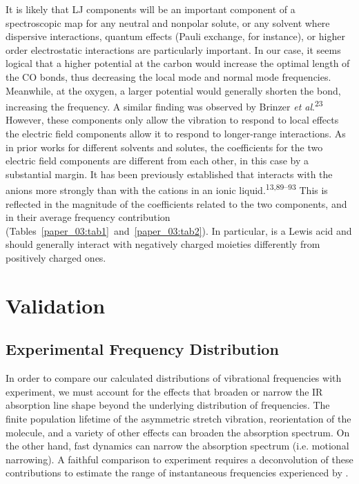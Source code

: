 \documentclass[]{article}
\begin{document}
It is likely that LJ components will be an important component of a spectroscopic map for any neutral and nonpolar solute, or any solvent where dispersive interactions, quantum effects (Pauli exchange, for instance), or higher order electrostatic interactions are particularly important. In our case, it seems logical that a higher potential at the carbon would increase the optimal length of the CO bonds, thus decreasing the local mode and normal mode frequencies. Meanwhile, at the oxygen, a larger potential would generally shorten the bond, increasing the frequency. A similar finding was observed by Brinzer \emph{et al}.\textsuperscript{23} However, these components only allow the  vibration to respond to local effects \textemdash{} the electric field components allow it to respond to longer-range interactions. As in prior works for different solvents and solutes, the coefficients for the two electric field components are different from each other, in this case by a substantial margin. It has been previously established that  interacts with the anions more strongly than with the cations in an ionic liquid.\textsuperscript{13,89--93} This is reflected in the magnitude of the coefficients related to the two components, and in their average frequency contribution (Tables~\ref{paper_03:tab1}~and~\ref{paper_03:tab2}). In particular,  is a Lewis acid and should generally interact with negatively charged moieties differently from positively charged ones.

\section{Validation}
\label{paper_03:sec:V}

\subsection{Experimental Frequency Distribution}
\label{paper_03:ssec:V-A}

In order to compare our calculated distributions of  vibrational frequencies with experiment, we must account for the effects that broaden or narrow the IR absorption line shape beyond the underlying distribution of frequencies. The finite population lifetime of the asymmetric stretch vibration, reorientation of the  molecule, and a variety of other effects can broaden the absorption spectrum. On the other hand, fast dynamics can narrow the absorption spectrum (i.e. motional narrowing). A faithful comparison to experiment requires a deconvolution of these contributions to estimate the range of instantaneous frequencies experienced by .
\end{document}

